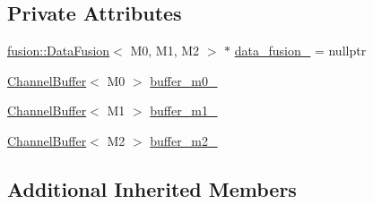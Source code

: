 \subsection*{Private Attributes}
\begin{DoxyCompactItemize}
\item 
\hyperlink{classapollo_1_1cyber_1_1data_1_1fusion_1_1DataFusion}{fusion\-::\-Data\-Fusion}$<$ M0, M1, M2 $>$ $\ast$ \hyperlink{classapollo_1_1cyber_1_1data_1_1DataVisitor_3_01M0_00_01M1_00_01M2_00_01NullType_01_4_a84a90a04bbe766d4e0cbf063be5bdc59}{data\-\_\-fusion\-\_\-} = nullptr
\item 
\hyperlink{classapollo_1_1cyber_1_1data_1_1ChannelBuffer}{Channel\-Buffer}$<$ M0 $>$ \hyperlink{classapollo_1_1cyber_1_1data_1_1DataVisitor_3_01M0_00_01M1_00_01M2_00_01NullType_01_4_a70d4d6ba83925cbf3944cb0ebb517ba7}{buffer\-\_\-m0\-\_\-}
\item 
\hyperlink{classapollo_1_1cyber_1_1data_1_1ChannelBuffer}{Channel\-Buffer}$<$ M1 $>$ \hyperlink{classapollo_1_1cyber_1_1data_1_1DataVisitor_3_01M0_00_01M1_00_01M2_00_01NullType_01_4_a386121942253c6fedf37b8d57fca8d9b}{buffer\-\_\-m1\-\_\-}
\item 
\hyperlink{classapollo_1_1cyber_1_1data_1_1ChannelBuffer}{Channel\-Buffer}$<$ M2 $>$ \hyperlink{classapollo_1_1cyber_1_1data_1_1DataVisitor_3_01M0_00_01M1_00_01M2_00_01NullType_01_4_a80b92e97959fdc21afe4ddc138374b99}{buffer\-\_\-m2\-\_\-}
\end{DoxyCompactItemize}
\subsection*{Additional Inherited Members}


